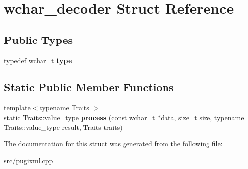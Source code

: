 \hypertarget{structwchar__decoder}{}\section{wchar\+\_\+decoder Struct Reference}
\label{structwchar__decoder}
\subsection*{Public Types}
\begin{DoxyCompactItemize}
\item 
\mbox{\label{structwchar__decoder_aafb01f17f51c610468f88b8820e36b7a}} 
typedef wchar\+\_\+t {\bfseries type}
\end{DoxyCompactItemize}
\subsection*{Static Public Member Functions}
\begin{DoxyCompactItemize}
\item 
\mbox{\label{structwchar__decoder_a965801bc1ce931281e10ee153586071c}} 
{\footnotesize template$<$typename Traits $>$ }\\static Traits\+::value\+\_\+type {\bfseries process} (const wchar\+\_\+t $\ast$data, size\+\_\+t size, typename Traits\+::value\+\_\+type result, Traits traits)
\end{DoxyCompactItemize}


The documentation for this struct was generated from the following file\+:\begin{DoxyCompactItemize}
\item 
src/pugixml.\+cpp\end{DoxyCompactItemize}
